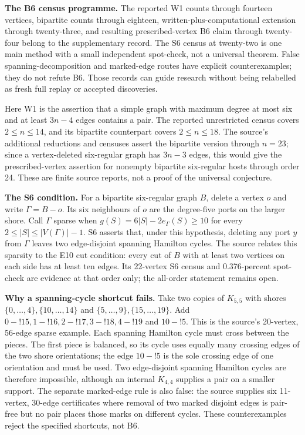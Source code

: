 \documentclass[smallextended]{svjour3}
\newcounter{none} %
\begin{document}
\textbf{The B6 census programme.} The reported W1 counts through
fourteen vertices, bipartite counts through eighteen,
written-plus-computational extension through twenty-three, and resulting
prescribed-vertex B6 claim through twenty-four belong to the
supplementary record. The S6 census at twenty-two is one main method
with a small independent spot-check, not a universal theorem. False
spanning-decomposition and marked-edge routes have explicit
counterexamples; they do not refute B6. Those records can guide research
without being relabelled as fresh full replay or accepted discoveries.

Here W1 is the assertion that a simple graph with maximum degree at most
six and at least \(3n-4\) edges contains a pair. The reported
unrestricted census covers \(2\le n\le14\), and its bipartite
counterpart covers \(2\le n\le18\). The source's additional reductions
and censuses assert the bipartite version through \(n=23\); since a
vertex-deleted six-regular graph has \(3n-3\) edges, this would give the
prescribed-vertex assertion for nonempty bipartite six-regular hosts
through order 24. These are finite source reports, not a proof of the
universal conjecture.

\textbf{The S6 condition.} For a bipartite six-regular graph \(B\),
delete a vertex \(o\) and write \(\Gamma=B-o\). Its six neighbours of
\(o\) are the degree-five ports on the larger shore. Call \(\Gamma\)
sparse when \(g(S)=6|S|-2e_\Gamma(S)\ge10\) for every
\(2\le|S|\le|V(\Gamma)|-1\). S6 asserts that, under this hypothesis,
deleting any port \(y\) from \(\Gamma\) leaves two edge-disjoint
spanning Hamilton cycles. The source relates this sparsity to the E10
cut condition: every cut of \(B\) with at least two vertices on each
side has at least ten edges. Its 22-vertex S6 census and 0.376-percent
spot-check are evidence at that order only; the all-order statement
remains open.

\textbf{Why a spanning-cycle shortcut fails.} Take two copies of
\(K_{5,5}\) with shores \(\{0,\ldots,4\},\{10,\ldots,14\}\) and
\(\{5,\ldots,9\},\{15,\ldots,19\}\). Add
\(0\!-!15,1\!-!16,2\!-!17,3\!-!18,4\!-!19\) and \(10\!-!5\). This is the
source's 20-vertex, 56-edge sparse example. Each spanning Hamilton cycle
must cross between the pieces. The first piece is balanced, so its cycle
uses equally many crossing edges of the two shore orientations; the edge
\(10\!-!5\) is the sole crossing edge of one orientation and must be
used. Two edge-disjoint spanning Hamilton cycles are therefore
impossible, although an internal \(K_{4,4}\) supplies a pair on a
smaller support. The separate marked-edge rule is also false: the source
supplies six 11-vertex, 30-edge certificates where removal of two marked
disjoint edges is pair-free but no pair places those marks on different
cycles. These counterexamples reject the specified shortcuts, not B6.
\end{document}
